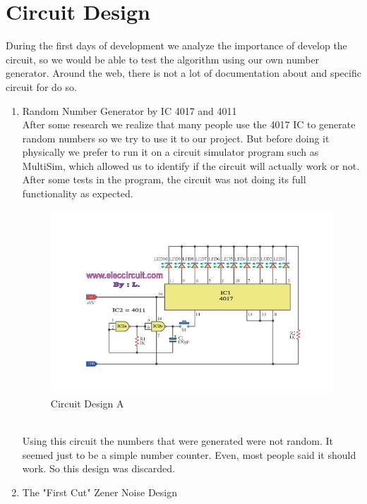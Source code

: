 \documentclass[twocolumn]{IEEEtran}
\begin{document}
    
\section{Circuit Design}
During the first days of development we analyze the importance of develop the circuit, so we would be able to test the algorithm using our own number generator. Around the web, there is not a lot of documentation about and specific circuit for do so.

\begin{enumerate} 
	\item Random Number Generator by IC 4017 and 4011\\
    
    After some research we realize that many people use the 4017 IC to generate random numbers so we try to use it to our project. But before doing it physically we prefer to run it on a circuit simulator program such as MultiSim, which allowed us to identify if the circuit will actually work or not. After some tests in the program, the circuit was not doing its full functionality as expected.\cite{23} \cite{28}
    \begin{figure}[h!]
	\centering
	\includegraphics[width=\columnwidth]{src/Rand_V1.jpg}
	\caption{Circuit Design A}
	\end{figure}\\
    
    Using this circuit the numbers that were generated were not random. It seemed just to be a simple number counter. Even, most people said it should work. So this design was discarded.\\
    
    \item The "First Cut" Zener Noise Design\\
    

\end{enumerate}
\end{document}
